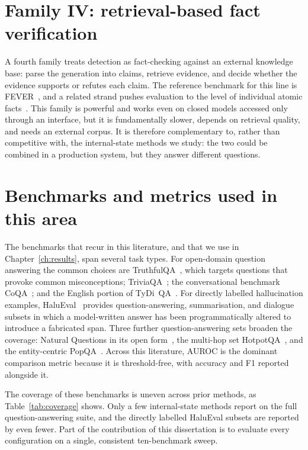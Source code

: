 \section{Family IV: retrieval-based fact verification}

A fourth family treats detection as fact-checking against an external knowledge base:
parse the generation into claims, retrieve evidence, and decide whether the evidence
supports or refutes each claim. The reference benchmark for this line is
FEVER~\cite{thorne2018fever}, and a related strand pushes evaluation to the level of
individual atomic facts~\cite{min2023factscore}. This family is powerful and works even
on closed models accessed only through an interface, but it is fundamentally slower,
depends on retrieval quality, and needs an external corpus. It is therefore complementary
to, rather than competitive with, the internal-state methods we study: the two could be
combined in a production system, but they answer different questions.

\section{Benchmarks and metrics used in this area}

The benchmarks that recur in this literature, and that we use in
Chapter~\ref{ch:results}, span several task types. For open-domain question answering the
common choices are TruthfulQA~\cite{lin2022truthfulqa}, which targets questions that
provoke common misconceptions; TriviaQA~\cite{joshi2017triviaqa}; the conversational
benchmark CoQA~\cite{reddy2019coqa}; and the English portion of
TyDi~QA~\cite{clark2020tydiqa}. For directly labelled hallucination examples,
HaluEval~\cite{li2023halueval} provides question-answering, summarisation, and
dialogue subsets in which a model-written answer has been programmatically altered to
introduce a fabricated span. Three further question-answering sets broaden the
coverage: Natural Questions in its open form~\cite{kwiatkowski2019nq}, the multi-hop set
HotpotQA~\cite{yang2018hotpotqa}, and the entity-centric PopQA~\cite{mallen2023popqa}.
Across this literature, AUROC is the dominant comparison metric because it is
threshold-free, with accuracy and F1 reported alongside it.

The coverage of these benchmarks is uneven across prior methods, as
Table~\ref{tab:coverage} shows. Only a few internal-state methods report on the full
question-answering suite, and the directly labelled HaluEval subsets are reported by even
fewer. Part of the contribution of this dissertation is to evaluate every configuration
on a single, consistent ten-benchmark sweep.

